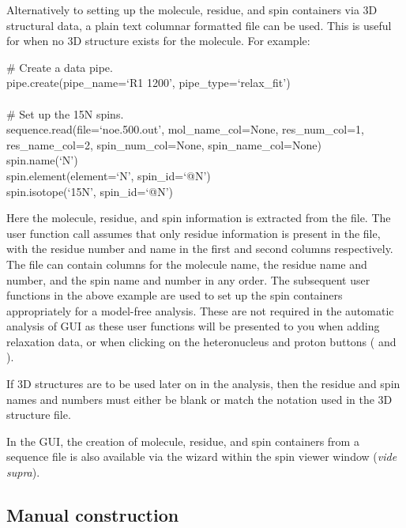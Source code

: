 Alternatively to setting up the molecule, residue, and spin containers via 3D structural data, a plain text columnar formatted file can be used.  This is useful for when no 3D structure exists for the molecule.  For example:

\begin{exampleenv}
\# Create a data pipe. \\
pipe.create(pipe\_name=`R1 1200', pipe\_type=`relax\_fit') \\
 \\
\# Set up the 15N spins. \\
sequence.read(file=`noe.500.out', mol\_name\_col=None, res\_num\_col=1, res\_name\_col=2, spin\_num\_col=None, spin\_name\_col=None) \\
spin.name(`N') \\
spin.element(element=`N', spin\_id=`@N') \\
spin.isotope(`15N', spin\_id=`@N')
\end{exampleenv}

Here the molecule, residue, and spin information is extracted from the  file.  The  user function call assumes that only residue information is present in the file, with the residue number and name in the first and second columns respectively.  The file can contain columns for the molecule name, the residue name and number, and the spin name and number in any order.  The subsequent user functions in the above example are used to set up the spin containers appropriately for a model-free analysis.  These are not required in the automatic analysis of GUI as these user functions will be presented to you when adding relaxation data, or when clicking on the heteronucleus and proton buttons ( and ).

If 3D structures are to be used later on in the analysis, then the residue and spin names and numbers must either be blank or match the notation used in the 3D structure file.

In the GUI, the creation of molecule, residue, and spin containers from a sequence file is also available via the  wizard within the spin viewer window (\textit{vide supra}).



\subsection{Manual construction} \label{sect: script - manual construction}

